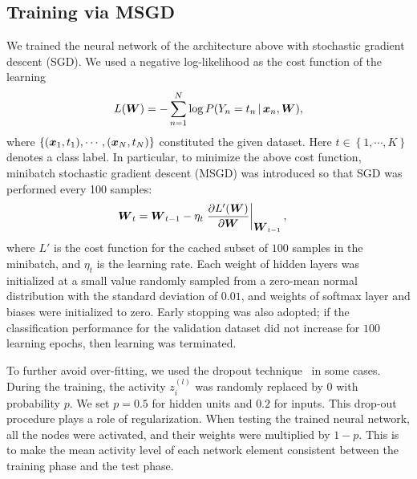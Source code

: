 \subsection{Training via MSGD}
We trained the neural network of the architecture above with stochastic gradient descent (SGD).
We used a negative log-likelihood as the cost function of the learning
\begin{equation}
  L(\mbox{\boldmath $W$}) = - \sum_{n=1}^{N} \log P(Y_n = t_n \,|\, \mbox{\boldmath $x$}_n, \mbox{\boldmath $W$}),
\end{equation}
%
where $\left\{(\mbox{\boldmath $x$}_1, t_1), \cdots, (\mbox{\boldmath $x$}_N, t_N)\right\}$ constituted the given dataset.
%
Here $t \in \left\{1, \cdots, K\right\}$ denotes a class label.
%
In particular, to minimize the above cost function, minibatch stochastic
gradient descent (MSGD) was introduced so that SGD was performed every
100 samples:
\begin{align} %
\bvec{W}_{t} &= \bvec{W}_{t-1} - \eta_{t} \left. \frac{\partial
L'(\bvec{W})}{\partial \bvec{W}} \right|_{\bvec{W}_{t-1}},
\end{align}
%
where $L'$ is the cost function for the cached subset of $100$ samples in
the minibatch, and $\eta_{t}$ is the learning rate.
Each weight of hidden layers was initialized at a small value randomly
sampled from a zero-mean normal distribution with the standard deviation
of $0.01$, and weights of softmax layer and biases were initialized to
zero.
Early stopping was also adopted; if the classification performance for the
validation dataset did not increase for $100$ learning epochs, then
learning was terminated.

To further avoid over-fitting, we used the dropout technique~\cite{Hinton2012} in some cases.
During the training, the activity $z^{(l)}_i$ was randomly replaced by $0$ with probability $p$.
We set $p = 0.5$ for hidden units and $0.2$ for inputs.
This drop-out procedure plays a role of regularization.
When testing the trained neural network,
all the nodes were activated, and their weights were multiplied by $1-p$.
This is to make the mean activity level of each network element consistent
between the training phase and the test phase.
